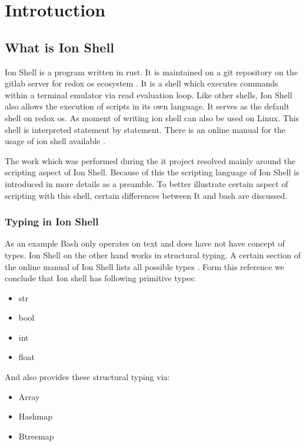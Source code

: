 \chapter{Introtuction}\label{ch:intro}

\section{What is Ion Shell}

Ion Shell is a program written in rust.
It is maintained on a git repository on the gitlab server for redox os ecosystem \cite{ion_shell}.
It is a shell which executes commands within a terminal emulator via read evaluation loop.
Like other shells, Ion Shell also allows the execution of scripts in its own language.
It serves as the default shell on redox os.
As moment of writing ion shell can also be used on Linux.
This shell is interpreted statement by statement.
There is an online manual for the usage of ion shell available \cite{ion_shell_online_manual}.

The work which was performed during the it project resolved mainly around the scripting aspect of Ion Shell.
Because of this the scripting language of Ion Shell is introduced in more details as a preamble.
To better illustrate certain aspect of scripting with this shell, certain differences between It and bash are discussed.

\subsection{Typing in Ion Shell}

As an example Bash only operates on text and does have not have concept of types.
Ion Shell on the other hand works in structural typing.
A certain section of the online manual of Ion Shell lists all possible types \cite{ion_shell_types}.
Form this reference we conclude that Ion shell has following primitive types:

\begin{itemize}
	\item str
	\item bool
	\item int
	\item float
\end{itemize}

And also provides these structural typing via:

\begin{itemize}
	\item Array
	\item Hashmap
	\item Btreemap
\end{itemize}

